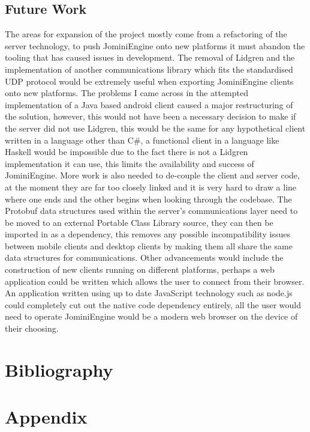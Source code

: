 \documentclass{article}
\begin{document}
\subsection{Future Work}
The areas for expansion of the project mostly come from a refactoring of the server technology, to push JominiEngine onto new platforms it must abandon the tooling that has caused issues in development. The removal of Lidgren and the implementation of another communications library which fits the standardised UDP protocol would be extremely useful when exporting JominiEngine clients onto new platforms. The problems I came across in the attempted implementation of a Java based android client caused a major restructuring of the solution, however, this would not have been a necessary decision to make if the server did not use Lidgren, this would be the same for any hypothetical client written in a language other than C\#, a functional client in a language like Haskell would be impossible due to the fact there is not a Lidgren implementation it can use, this limits the availability and success of JominiEngine. 
More work is also needed to de-couple the client and server code, at the moment they are far too closely linked and it is very hard to draw a line where one ends and the other begins when looking through the codebase. The Protobuf data structures used within the server’s communications layer need to be moved to an external Portable Class Library source, they can then be imported in as a dependency, this removes any possible incompatibility issues between mobile clients and desktop clients by making them all share the same data structures for communications.
Other advancements would include the construction of new clients running on different platforms, perhaps a web application could be written which allows the user to connect from their browser. An application written using up to date JavaScript technology such as node.js could completely cut out the native code dependency entirely, all the user would need to operate JominiEngine would be a modern web browser on the device of their choosing.
	\newpage
	\section{Bibliography}
	\printbibliography
	\newpage
	\section{Appendix}
\end{document}
